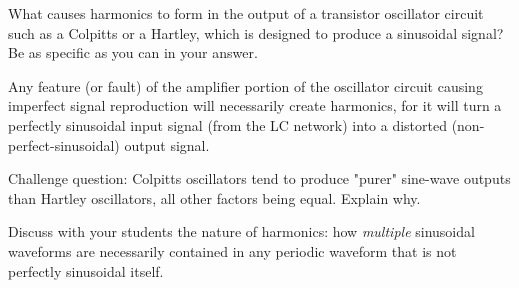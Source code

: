 

What causes harmonics to form in the output of a transistor oscillator circuit such as a Colpitts or a Hartley, which is designed to produce a sinusoidal signal?  Be as specific as you can in your answer.







Any feature (or fault) of the amplifier portion of the oscillator circuit causing imperfect signal reproduction will necessarily create harmonics, for it will turn a perfectly sinusoidal input signal (from the LC network) into a distorted (non-perfect-sinusoidal) output signal.

\vskip 10pt

Challenge question: Colpitts oscillators tend to produce "purer" sine-wave outputs than Hartley oscillators, all other factors being equal.  Explain why.







Discuss with your students the nature of harmonics: how {\it multiple} sinusoidal waveforms are necessarily contained in any periodic waveform that is not perfectly sinusoidal itself.




